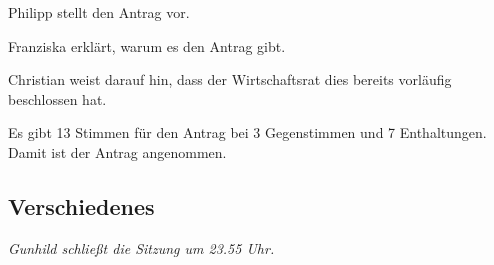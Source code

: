 \documentclass[ngerman,headheight=70pt]{scrartcl}
\begin{document}
    Philipp stellt den Antrag vor.

    Franziska erklärt, warum es den Antrag gibt.

    Christian weist darauf hin, dass der Wirtschaftsrat dies bereits vorläufig
    beschlossen hat.

    Es gibt 13 Stimmen für den Antrag bei 3 Gegenstimmen und 7 Enthaltungen.
    Damit ist der Antrag angenommen.

    \subsection{Verschiedenes}

    \textit{Gunhild schließt die Sitzung um 23.55 Uhr.}
\end{document}
